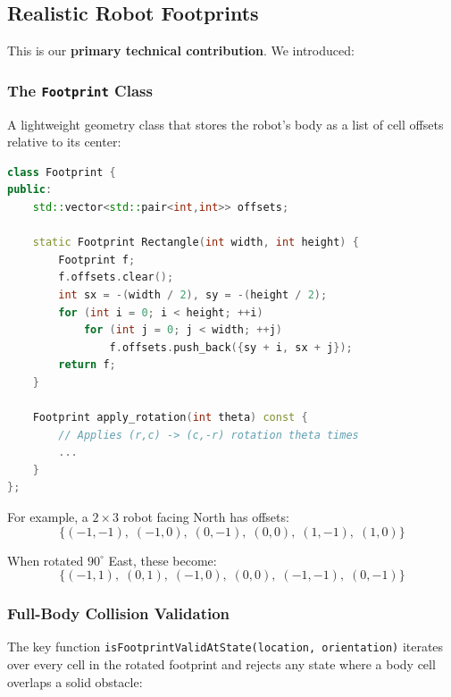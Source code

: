 \documentclass[12pt, a4paper]{article}
\begin{document}
\subsection{Realistic Robot Footprints}
\label{sec:footprint}

This is our \textbf{primary technical contribution}. We introduced:

\subsubsection{The \texttt{Footprint} Class}

A lightweight geometry class that stores the robot's body as a list of cell offsets relative to its center:

\begin{lstlisting}[language=C++, caption={Footprint definition (simplified)}]
class Footprint {
public:
    std::vector<std::pair<int,int>> offsets;

    static Footprint Rectangle(int width, int height) {
        Footprint f;
        f.offsets.clear();
        int sx = -(width / 2), sy = -(height / 2);
        for (int i = 0; i < height; ++i)
            for (int j = 0; j < width; ++j)
                f.offsets.push_back({sy + i, sx + j});
        return f;
    }

    Footprint apply_rotation(int theta) const {
        // Applies (r,c) -> (c,-r) rotation theta times
        ...
    }
};
\end{lstlisting}

For example, a $2\times3$ robot facing North has offsets:
\[
\{(-1,-1),\; (-1,0),\; (0,-1),\; (0,0),\; (1,-1),\; (1,0)\}
\]

When rotated $90^\circ$ East, these become:
\[
\{(-1,1),\; (0,1),\; (-1,0),\; (0,0),\; (-1,-1),\; (0,-1)\}
\]

\subsubsection{Full-Body Collision Validation}

The key function \texttt{isFootprintValidAtState(location, orientation)} iterates over every cell in the rotated footprint and rejects any state where a body cell overlaps a solid obstacle:
\end{document}
